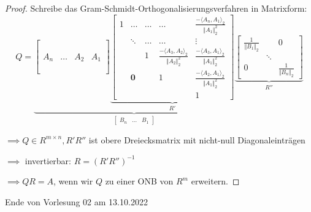 \documentclass{book}
\begin{document}
        \begin{proof}
            Schreibe das Gram-Schmidt-Orthogonalisierungsverfahren in Matrixform:
            \[
            Q=\underbrace{\begin{bmatrix}
                &&&\\
                &&&\\
                &&&\\
                A_n & \dots & A_2 & A_1\\
                &&&\\
                &&&\\
                &&&
            \end{bmatrix}
            \underbrace{
            \begin{bmatrix}
                1 & \dots  & \dots & \dots & \frac{-\langle A_n,A_1 \rangle_2}{\Vert A_1 \Vert_2^2}\\
                  & \ddots & \dots & \dots & \vdots \\
                  &        & 1 & \frac{-\langle A_3,A_2 \rangle_2}{\Vert A_2 \Vert_2^2} & \frac{-\langle A_3,A_1 \rangle_2}{\Vert A_1 \Vert_2^2}\\
                  & \textbf{0} &  & 1 & \frac{-\langle A_2,A_1 \rangle_2}{\Vert A_1 \Vert_2^2} \\
                  & & &  & 1
            \end{bmatrix}}_{R'}}_{\begin{bmatrix}
                B_n & \dots &  B_1
            \end{bmatrix}} 
            \underbrace{
            \begin{bmatrix}
                \frac{1}{\Vert B_1 \Vert_2} & & 0\\
                & \ddots& \\
                0 & &  \frac{1}{\Vert B_n \Vert_2}
            \end{bmatrix}}_{R''}
            \]

            $\implies Q\in R^{m\times n},R'R''$ ist obere Dreiecksmatrix mit nicht-null Diagonaleinträgen

            $\implies$ invertierbar: $R=(R'R'')^{-1}$
            
            $\implies QR=A$, wenn wir $Q$ zu einer ONB von $R^m$ erweitern.
        \end{proof}
       
        \noindent
        \xrfill[0.7ex]{1pt}Ende von Vorlesung 02 am 13.10.2022\xrfill[0.7ex]{1pt}
        
\end{document}
